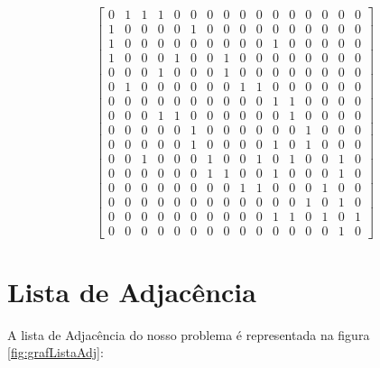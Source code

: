 	
	\begin{equation} \label{eq:matrizAdj}
		\begin{bmatrix}
			0 & 1 & 1 & 1 & 0 & 0 & 0 & 0 & 0 & 0 & 0 & 0 & 0 & 0 & 0 & 0\\%
			1 & 0 & 0 & 0 & 0 & 1 & 0 & 0 & 0 & 0 & 0 & 0 & 0 & 0 & 0 & 0\\%
			1 & 0 & 0 & 0 & 0 & 0 & 0 & 0 & 0 & 0 & 1 & 0 & 0 & 0 & 0 & 0\\%
			1 & 0 & 0 & 0 & 1 & 0 & 0 & 1 & 0 & 0 & 0 & 0 & 0 & 0 & 0 & 0\\%
			0 & 0 & 0 & 1 & 0 & 0 & 0 & 1 & 0 & 0 & 0 & 0 & 0 & 0 & 0 & 0\\%
			0 & 1 & 0 & 0 & 0 & 0 & 0 & 0 & 1 & 1 & 0 & 0 & 0 & 0 & 0 & 0\\%
			0 & 0 & 0 & 0 & 0 & 0 & 0 & 0 & 0 & 0 & 1 & 1 & 0 & 0 & 0 & 0\\%
			0 & 0 & 0 & 1 & 1 & 0 & 0 & 0 & 0 & 0 & 0 & 1 & 0 & 0 & 0 & 0\\%
			0 & 0 & 0 & 0 & 0 & 1 & 0 & 0 & 0 & 0 & 0 & 0 & 1 & 0 & 0 & 0\\%
			0 & 0 & 0 & 0 & 0 & 1 & 0 & 0 & 0 & 0 & 1 & 0 & 1 & 0 & 0 & 0\\%
			0 & 0 & 1 & 0 & 0 & 0 & 1 & 0 & 0 & 1 & 0 & 1 & 0 & 0 & 1 & 0\\%
			0 & 0 & 0 & 0 & 0 & 0 & 1 & 1 & 0 & 0 & 1 & 0 & 0 & 0 & 1 & 0\\%
			0 & 0 & 0 & 0 & 0 & 0 & 0 & 0 & 1 & 1 & 0 & 0 & 0 & 1 & 0 & 0\\%
			0 & 0 & 0 & 0 & 0 & 0 & 0 & 0 & 0 & 0 & 0 & 0 & 1 & 0 & 1 & 0\\%
			0 & 0 & 0 & 0 & 0 & 0 & 0 & 0 & 0 & 0 & 1 & 1 & 0 & 1 & 0 & 1\\%
			0 & 0 & 0 & 0 & 0 & 0 & 0 & 0 & 0 & 0 & 0 & 0 & 0 & 0 & 1 & 0 %
		\end{bmatrix}
	\end{equation}
	
	
	
	\section{Lista de Adjacência}\label{sec:lista}
	
	A lista de Adjacência do nosso problema é representada na figura \ref{fig:grafListaAdj}:
	
